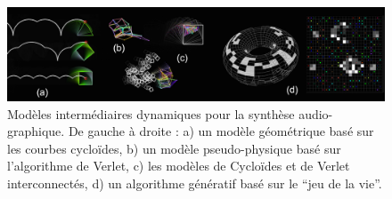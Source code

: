 \begin{figure}[!htbp]
	\captionsetup{format=plain}
	\includegraphics[width=\textwidth]{gfx/04_algorithms/OrJo_MID_1200x300px.png}
	\caption[Modèles intermédiaires dynamiques pour la synthèse audio-graphique]{Modèles intermédiaires dynamiques pour la synthèse audio-graphique. De gauche à droite : a) un modèle géométrique basé sur les courbes cycloïdes, b) un modèle pseudo-physique basé sur l'algorithme de Verlet, c) les modèles de Cycloïdes et de Verlet interconnectés, d) un algorithme génératif basé sur le ``jeu de la vie''.}
	\label{fig:algorithms:MP-MID}
\end{figure}

